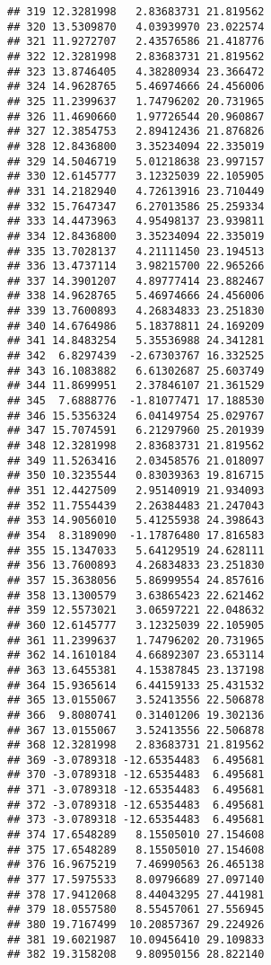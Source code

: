 \documentclass[]{article}
\begin{document}
\begin{verbatim}
## 319 12.3281998   2.83683731 21.819562
## 320 13.5309870   4.03939970 23.022574
## 321 11.9272707   2.43576586 21.418776
## 322 12.3281998   2.83683731 21.819562
## 323 13.8746405   4.38280934 23.366472
## 324 14.9628765   5.46974666 24.456006
## 325 11.2399637   1.74796202 20.731965
## 326 11.4690660   1.97726544 20.960867
## 327 12.3854753   2.89412436 21.876826
## 328 12.8436800   3.35234094 22.335019
## 329 14.5046719   5.01218638 23.997157
## 330 12.6145777   3.12325039 22.105905
## 331 14.2182940   4.72613916 23.710449
## 332 15.7647347   6.27013586 25.259334
## 333 14.4473963   4.95498137 23.939811
## 334 12.8436800   3.35234094 22.335019
## 335 13.7028137   4.21111450 23.194513
## 336 13.4737114   3.98215700 22.965266
## 337 14.3901207   4.89777414 23.882467
## 338 14.9628765   5.46974666 24.456006
## 339 13.7600893   4.26834833 23.251830
## 340 14.6764986   5.18378811 24.169209
## 341 14.8483254   5.35536988 24.341281
## 342  6.8297439  -2.67303767 16.332525
## 343 16.1083882   6.61302687 25.603749
## 344 11.8699951   2.37846107 21.361529
## 345  7.6888776  -1.81077471 17.188530
## 346 15.5356324   6.04149754 25.029767
## 347 15.7074591   6.21297960 25.201939
## 348 12.3281998   2.83683731 21.819562
## 349 11.5263416   2.03458576 21.018097
## 350 10.3235544   0.83039363 19.816715
## 351 12.4427509   2.95140919 21.934093
## 352 11.7554439   2.26384483 21.247043
## 353 14.9056010   5.41255938 24.398643
## 354  8.3189090  -1.17876480 17.816583
## 355 15.1347033   5.64129519 24.628111
## 356 13.7600893   4.26834833 23.251830
## 357 15.3638056   5.86999554 24.857616
## 358 13.1300579   3.63865423 22.621462
## 359 12.5573021   3.06597221 22.048632
## 360 12.6145777   3.12325039 22.105905
## 361 11.2399637   1.74796202 20.731965
## 362 14.1610184   4.66892307 23.653114
## 363 13.6455381   4.15387845 23.137198
## 364 15.9365614   6.44159133 25.431532
## 365 13.0155067   3.52413556 22.506878
## 366  9.8080741   0.31401206 19.302136
## 367 13.0155067   3.52413556 22.506878
## 368 12.3281998   2.83683731 21.819562
## 369 -3.0789318 -12.65354483  6.495681
## 370 -3.0789318 -12.65354483  6.495681
## 371 -3.0789318 -12.65354483  6.495681
## 372 -3.0789318 -12.65354483  6.495681
## 373 -3.0789318 -12.65354483  6.495681
## 374 17.6548289   8.15505010 27.154608
## 375 17.6548289   8.15505010 27.154608
## 376 16.9675219   7.46990563 26.465138
## 377 17.5975533   8.09796689 27.097140
## 378 17.9412068   8.44043295 27.441981
## 379 18.0557580   8.55457061 27.556945
## 380 19.7167499  10.20857367 29.224926
## 381 19.6021987  10.09456410 29.109833
## 382 19.3158208   9.80950156 28.822140

\end{verbatim}
\end{document}
